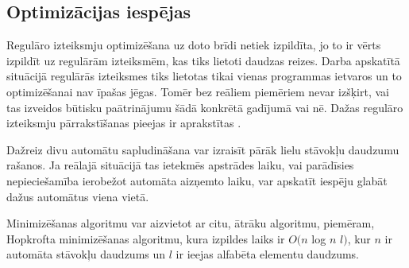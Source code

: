 \subsection{\label{subsec:solution_optimization}Optimizācijas iespējas}

Regulāro izteiksmju optimizēšana uz doto brīdi netiek izpildīta, jo to ir vērts izpildīt uz regulārām izteiksmēm, kas tiks lietoti daudzas reizes. Darba apskatītā situācijā regulārās izteiksmes tiks lietotas tikai vienas programmas ietvaros un to optimizēšanai nav īpašas jēgas. Tomēr bez reāliem piemēriem nevar izšķirt, vai tas izveidos būtisku paātrinājumu šādā konkrētā gadījumā vai nē. Dažas regulāro izteiksmju pārrakstīšanas pieejas ir aprakstītas \cite{Yu:FMR}.

Dažreiz divu automātu sapludināšana var izraisīt pārāk lielu stāvokļu daudzumu rašanos. Ja reālajā situācijā tas ietekmēs apstrādes laiku, vai parādīsies nepieciešamība ierobežot automāta aizņemto laiku, var apskatīt iespēju glabāt dažus automātus viena vietā. \cite{Yu:FMR}

Minimizēšanas algoritmu var aizvietot ar citu, ātrāku algoritmu, piemēram, Hopkrofta minimizēšanas algoritmu, kura izpildes laiks ir $O(n$ log $n$ $l)$, kur $n$ ir automāta stāvokļu daudzums un $l$ ir ieejas alfabēta elementu daudzums.\cite{Berstel:MA}